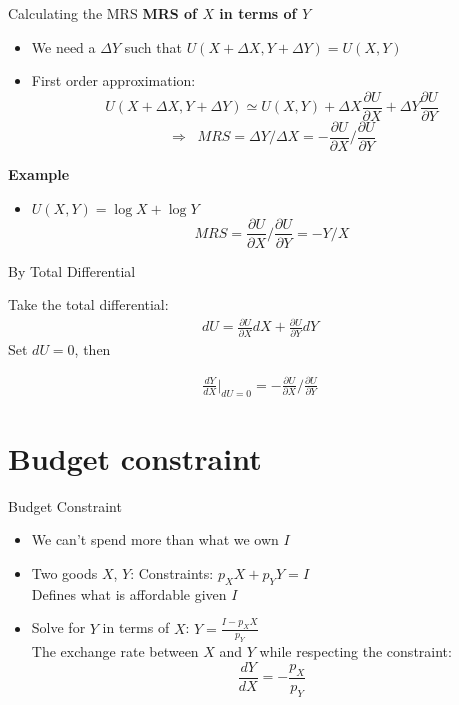 \documentclass[handout]{beamer}
\begin{document}
\begin{frame}{Calculating the MRS}
\textbf{MRS of $X$ in terms of $Y$} \pause
\begin{itemize}
\item We need a $\Delta Y$ such that $U(X + \Delta X, Y + \Delta Y) = U(X,Y)$
\item First order approximation: $$U(X+\Delta X, Y+ \Delta Y) \simeq  U(X,Y)+  \Delta X  \frac{\partial U}{\partial X} + \Delta Y \frac{\partial U}{\partial Y}$$\pause
$$ \Rightarrow \;\; MRS = \Delta Y/ \Delta X =  -\frac{\partial U}{\partial X}/ \frac{\partial U}{\partial Y}$$
\end{itemize}

\textbf{Example}
\begin{itemize}
\item $U(X,Y) = \log X + \log Y$
 $$MRS = \frac{\partial U}{\partial X}/ \frac{\partial U}{\partial Y} = -Y/X$$
\end{itemize}

\end{frame}

\begin{frame}{By Total Differential}

Take the total differential:
\begin{align}
dU = \frac{\partial U}{\partial X}dX + \frac{\partial U}{\partial Y}dY
\end{align}
Set $dU = 0$, then 

\begin{align}
\frac{dY}{dX}\bigg\rvert_{dU=0} = -\frac{\partial U}{\partial X}/ \frac{\partial U}{\partial Y}
\end{align}

\end{frame}


\section{Budget constraint}

\begin{frame}{Budget Constraint}
\begin{itemize}
\item We can't spend more than what we own $I$
\item Two goods $X$, $Y$:  Constraints: $p_X X + p_Y Y = I$ \\ Defines what is affordable given $I$\\
\item Solve for $Y$ in terms of  $X$:     $Y = \frac{I - p_X X}{p_Y}$\\
The exchange rate between $X$ and $Y$ while respecting the constraint: $$\frac{dY}{dX} = -\frac{p_X}{p_Y}$$
\end{itemize}

\end{frame}
\end{document}
